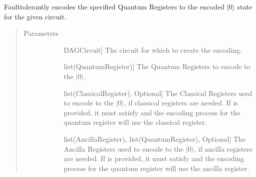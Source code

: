 \documentclass[letterpaper,10pt,english]{sphinxmanual}
\begin{document}
\begin{fulllineitems}
\begin{fulllineitems}
\begin{quote}
\begin{description}
\begin{description}
\end{description}

\end{description}\end{quote}

\end{fulllineitems}


\begin{fulllineitems}
\label{\detokenize{Base:BaseFaultTolerance.FaultTolerantEncoder.getEncoderCircuit}}
Fault\sphinxhyphen{}tolerantly encodes the specified Quantum Registers to the encoded \(|0\rangle\) state for the given circuit.
\begin{quote}\begin{description}
\item[{Parameters}] \leavevmode\begin{description}
\item[{}] \leavevmode{[}DAGCircuit{]}
The circuit for which to create the encoding.

\item[{}] \leavevmode{[}list(QuantumRegister){]}
The Quantum Registers to encode to the \(|0\rangle\).

\item[{}] \leavevmode{[}list(ClassicalRegister), Optional{]}
The Classical Registers used to encode to the \(|0\rangle\), if classical registers are needed. If  is provided, it must satisfy  and the encoding process for the  quantum register will use the  classical register.

\item[{}] \leavevmode{[}list(AncillaRegister), list(QuantumRegister), Optional{]}
The Ancilla Registers used to encode to the \(|0\rangle\), if ancilla registers are needed. If  is provided, it must satisfy  and the encoding process for the  quantum register will use the  ancilla register.


\end{description}
\end{description}
\end{quote}
\end{fulllineitems}
\end{fulllineitems}
\end{document}
